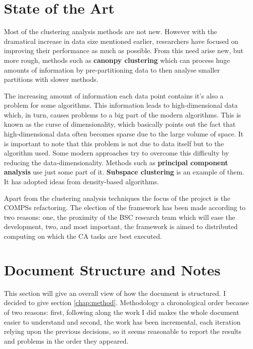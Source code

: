 \section{State of the Art}


Most of the clustering analysis methods are not new. However with the dramatical increase in data size mentioned earlier, researchers have focused on improving their performance as much as possible. From this need arise new, but more rough, methods such as \textbf{canonpy clustering} \cite{Nayak2015} which can process huge amounts of information by pre-partitioning data to then analyse smaller partitions with slower methods.

The increasing amount of information each data point contains it's also a problem for some algorithms. This information leads to high-dimensional data which, in turn, causes problems to a big part of the modern algorithms. This is known as the curse of dimensionality, which basically points out the fact that high-dimensional data often becomes sparse due to the large volume of space. It is important to note that this problem is not due to data itself but to the algorithm used. Some modern approaches try to overcome this difficulty by reducing the data-dimensionality. Methods such as \textbf{principal component analysis} \cite{Kupski2015} use just some part of it. \textbf{Subspace clustering} \cite{Adler2015} is an example of them. It has adopted ideas from density-based algorithms.

Apart from the clustering analysis techniques the focus of the project is the COMPSs refactoring. The election of the framework has been made according to two reasons: one, the proximity of the BSC research team which will ease the development, two, and most important, the framework is aimed to distributed computing on which the CA tasks are best executed. 


\section{Document Structure and Notes}

This section will give an overall view of how the document is structured. I decided to give section \ref{chap:method}. Methodology a chronological order because of two reasons: first, following along the work I did makes the whole document easier to understand and second, the work has been incremental, each iteration relying upon the previous decisions, so it seems reasonable to report the results and problems in the order they appeared. 



